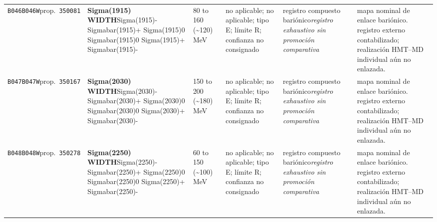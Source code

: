 \begin{landscape}
\begin{longtable}{L{1.85cm}L{4.45cm}L{2.35cm}L{4.05cm}L{3.35cm}L{7.15cm}}
\texttt{B046}\newline \texttt{B046W}\newline prop.\ \texttt{350081} & \textbf{Sigma(1915) WIDTH}\newline Sigma(1915)- \textbar{}\allowbreak{} Sigmabar(1915)+ \textbar{}\allowbreak{} Sigma(1915)0 \textbar{}\allowbreak{} Sigmabar(1915)0 \textbar{}\allowbreak{} Sigma(1915)+ \textbar{}\allowbreak{} Sigmabar(1915)- & 80 to 160 (\textasciitilde{}120)\,MeV & no aplicable; no aplicable; tipo E; límite R; confianza no consignado & registro compuesto bariónico\newline \emph{registro exhaustivo sin promoción comparativa} & mapa nominal de enlace bariónico. registro externo contabilizado; realización HMT--MD individual aún no enlazada. \\
\texttt{B047}\newline \texttt{B047W}\newline prop.\ \texttt{350167} & \textbf{Sigma(2030) WIDTH}\newline Sigma(2030)- \textbar{}\allowbreak{} Sigmabar(2030)+ \textbar{}\allowbreak{} Sigma(2030)0 \textbar{}\allowbreak{} Sigmabar(2030)0 \textbar{}\allowbreak{} Sigma(2030)+ \textbar{}\allowbreak{} Sigmabar(2030)- & 150 to 200 (\textasciitilde{}180)\,MeV & no aplicable; no aplicable; tipo E; límite R; confianza no consignado & registro compuesto bariónico\newline \emph{registro exhaustivo sin promoción comparativa} & mapa nominal de enlace bariónico. registro externo contabilizado; realización HMT--MD individual aún no enlazada. \\
\texttt{B048}\newline \texttt{B048W}\newline prop.\ \texttt{350278} & \textbf{Sigma(2250) WIDTH}\newline Sigma(2250)- \textbar{}\allowbreak{} Sigmabar(2250)+ \textbar{}\allowbreak{} Sigma(2250)0 \textbar{}\allowbreak{} Sigmabar(2250)0 \textbar{}\allowbreak{} Sigma(2250)+ \textbar{}\allowbreak{} Sigmabar(2250)- & 60 to 150 (\textasciitilde{}100)\,MeV & no aplicable; no aplicable; tipo E; límite R; confianza no consignado & registro compuesto bariónico\newline \emph{registro exhaustivo sin promoción comparativa} & mapa nominal de enlace bariónico. registro externo contabilizado; realización HMT--MD individual aún no enlazada. \\

\end{longtable}
\end{landscape}
